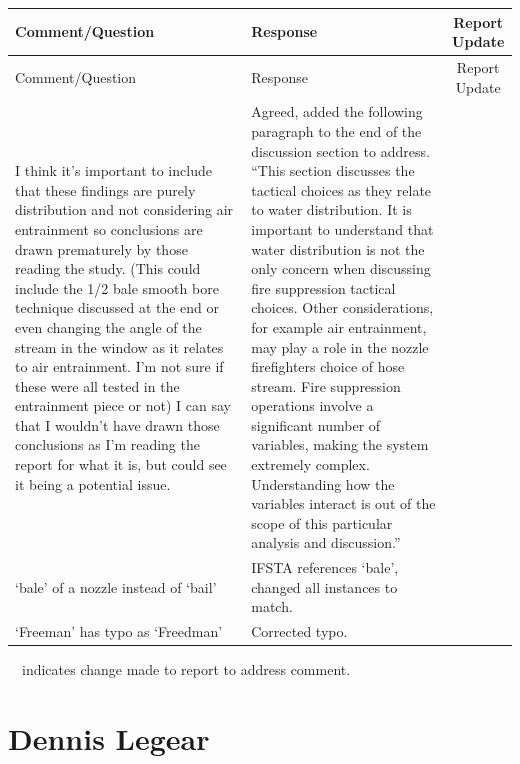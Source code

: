 \documentclass[12pt,oneside]{book}
\begin{document}
\begin{landscape}
\begin{longtable}{|L{4in}|L{3.75in}|c|}
		\hline
		Comment/Question & Response & Report Update \\ 
		\toprule[1.0pt] \endfirsthead
		\hline
		Comment/Question & Response & Report Update \\ 
		\toprule[1.0pt] \endhead
		\hline
		I think it's important to include that these findings are purely distribution and not considering air entrainment so conclusions are drawn prematurely by those reading the study. (This could include the 1/2 bale smooth bore technique discussed at the end or even changing the angle of the stream in the window as it relates to air entrainment. I'm not sure if these were all tested in the entrainment piece or not) I can say that I wouldn't have drawn those conclusions as I'm reading the report for what it is, but could see it being a potential issue. & 
		Agreed, added the following paragraph to the end of the discussion section to address. ``This section discusses the tactical choices as they relate to water distribution. It is important to understand that water distribution is not the only concern when discussing fire suppression tactical choices. Other considerations, for example air entrainment, may play a role in the nozzle firefighters choice of hose stream. Fire suppression operations involve a significant number of variables, making the system extremely complex. Understanding how the variables interact is out of the scope of this particular analysis and discussion.'' & \checkmark \\

		\hline
		`bale' of a nozzle instead of `bail' & 
		IFSTA references `bale', changed all instances to match. & \checkmark \\

		\hline
		`Freeman' has typo as `Freedman' & 
		Corrected typo. & \checkmark \\

		\hline
\end{longtable}
\checkmark~~indicates change made to report to address comment.

\newpage

\section{Dennis Legear}
\begin{longtable}{|L{4in}|L{3.75in}|c|}
		

\end{longtable}
\end{landscape}
\end{document}
